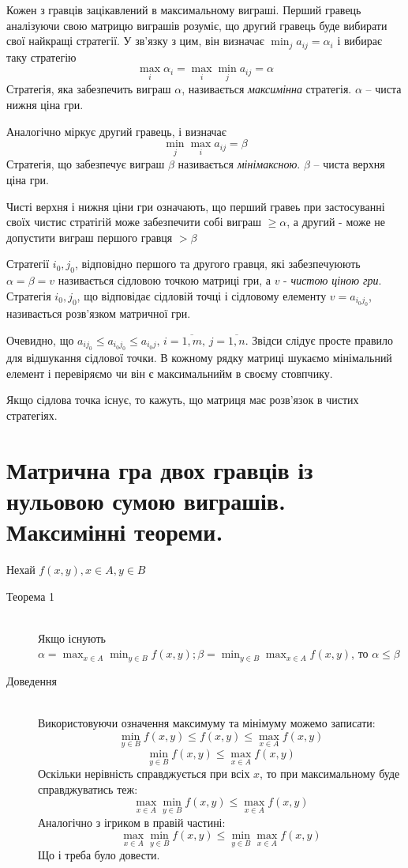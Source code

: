 \documentclass[12pt,a4paper]{article}
\begin{document}
Кожен з гравців зацікавлений в максимальному виграші. Перший гравець аналізуючи свою матрицю виграшів розуміє, що другий гравець буде вибирати свої найкращі стратегії. У зв'язку з цим, він визначає $\displaystyle \min_j a_{ij} = \alpha_i$ і вибирає таку стратегію
\begin{equation}
	\max_i \alpha_i = \max_i \min_j a_{ij} = \alpha
\end{equation}
Стратегія, яка забезпечить виграш $\alpha$, називається \emph{максимінна} стратегія. $\alpha$ -- чиста нижня ціна гри.

Аналогічно міркує другий гравець, і визначає
\[
	\min_j \max_i a_{ij} = \beta
\]
Стратегія, що забезпечує виграш $\beta$ називається \emph{мінімаксною}. $\beta$ -- чиста верхня ціна гри.

Чисті верхня і нижня ціни гри означають, що перший гравеь при застосуванні своїх чистис стратігій може забезпечити собі виграш $\ge\alpha$, а другий - може не допустити виграш першого гравця $>\beta$

Стратегії $i_0, j_0$, відповідно першого та другого гравця, які забезпечуюють $\alpha = \beta = v$ називається сідловою точкою матриці гри, а $v$ - \emph{чистою ціною гри}.
Стратегія $i_0, j_0$, що відповідає сідловій точці і сідловому елементу $v=a_{i_0j_0}$, називається розв'язком матричної гри.

Очевидно, що $a_{ij_0} \le a_{i_0j_0} \le a_{i_0j},\,i=\overline{1, m},\,j=\overline{1, n}$. Звідси слідує просте правило для відшукання сідлової точки. В кожному рядку матриці шукаємо мінімальний елемент і перевіряємо чи він є максимальнийм в своєму стовпчику.

Якщо сідлова точка існує, то кажуть, що матриця має розв'язок в чистих стратегіях.

\clearpage

\section{Матрична гра двох гравців із нульовою сумою виграшів. Максимінні теореми.}

Нехай $f(x, y), x \in A, y \in B$

\begin{description}

\item[Теорема 1] \hfill \\
Якщо існують $\displaystyle \alpha = \max_{x \in A} \min_{y \in B} f(x, y); \beta = \min_{y \in B} \max_{x \in A} f(x, y)$, то $\alpha \le \beta$

\item[Доведення] \hfill \\
Використовуючи означення максимуму та мінімуму можемо записати:
\[
\min_{y \in B}f(x, y) \le f(x, y) \le \max_{x \in A}f(x, y)
\]
\[
\min_{y \in B}f(x, y) \le \max_{x \in A}f(x, y)
\]
Оскільки нерівність справджується при всіх $x$, то при максимальному буде справджуватись теж:
\[
\max_{x \in A} \min_{y \in B}f(x, y) \le \max_{x \in A}f(x, y)
\]
Аналогічно з ігриком в правій частині:
\[
\max_{x \in A} \min_{y \in B}f(x, y) \le \min_{y \in B} \max_{x \in A}f(x, y)
\]
Що і треба було довести.
\end{description}
\end{document}
